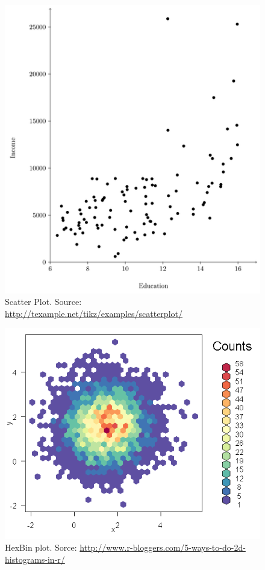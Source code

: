 \documentclass[12pt,a4paper]{report}
\begin{document}
\begin{figure}[h]
\centering
\includegraphics[height=0.3\textheight]{art/scatterplot}
\caption[Scatter Plot]{Scatter Plot. Source: \url{http://texample.net/tikz/examples/scatterplot/}}
\label{fig:scatterplot}
\end{figure}





\begin{figure}[h]
\centering
\includegraphics[height=0.3\textheight]{art/hexbin2}
\caption[HexBin Plot]{HexBin plot. Sorce: \url{http://www.r-bloggers.com/5-ways-to-do-2d-histograms-in-r/}}
\label{fig:hexbin}
\end{figure}
\end{document}
